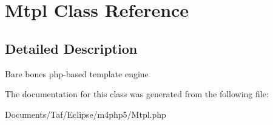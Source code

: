\hypertarget{classMtpl}{
\section{Mtpl Class Reference}
\label{classMtpl}
}


\subsection{Detailed Description}
Bare bones php-based template engine 

The documentation for this class was generated from the following file:\begin{CompactItemize}
\item 
Documents/Taf/Eclipse/m4php5/Mtpl.php\end{CompactItemize}
